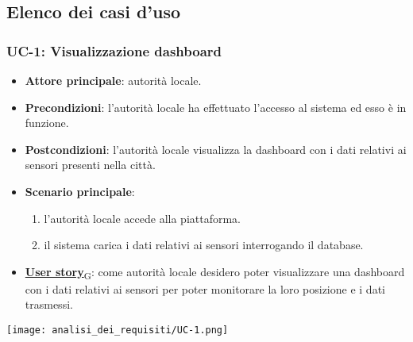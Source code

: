 \subsection{Elenco dei casi d'uso}
\subsubsection{UC-1: Visualizzazione dashboard}
\begin{itemize}
	\item \textbf{Attore principale}: autorità locale.
	\item \textbf{Precondizioni}: l'autorità locale ha effettuato l'accesso al sistema ed esso è in funzione.
	\item \textbf{Postcondizioni}: l'autorità locale visualizza la dashboard con i dati relativi ai sensori presenti nella città.
	\item \textbf{Scenario principale}:
	      \begin{enumerate}
		      \item l'autorità locale accede alla piattaforma.
		      \item il sistema carica i dati relativi ai sensori interrogando il database.
	      \end{enumerate}
	\item \href{https://7last.github.io/docs/rtb/documentazione-interna/glossario\#user-story}{\textbf{User story}\textsubscript{G}}:
	      come autorità locale desidero poter visualizzare una dashboard con i dati relativi ai sensori per poter monitorare la loro posizione e i dati trasmessi.
\end{itemize}
\begin{center}
	\texttt{[image: analisi\_dei\_requisiti/UC-1.png]}
\end{center}

